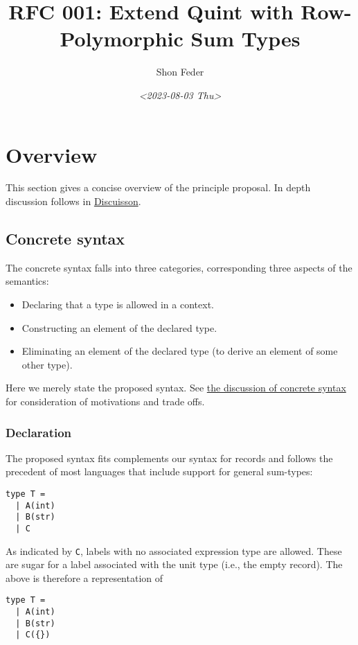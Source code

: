 \documentclass[11pt]{article}
\author{Shon Feder}
\date{\textit{<2023-08-03 Thu>}}
\title{RFC 001: Extend Quint with Row-Polymorphic Sum Types}
\begin{document}
\maketitle
\tableofcontents


\section{Overview}
\label{sec:org1baf532}
This section gives a concise overview of the principle proposal. In
depth discussion follows in \hyperref[sec:org3b0e6b8]{Discuisson}.

\subsection{Concrete syntax}
\label{sec:org047ba8c}
The concrete syntax falls into three categories, corresponding three aspects of
the semantics:

\begin{itemize}
\item Declaring that a type is allowed in a context.
\item Constructing an element of the declared type.
\item Eliminating an element of the declared type (to derive an element of some
other type).
\end{itemize}

Here we merely state the proposed syntax. See \hyperref[sec:orgf128100]{the discussion of concrete syntax}
for consideration of motivations and trade offs.

\subsubsection{Declaration}
\label{sec:orgb260f62}
The proposed syntax fits complements our syntax for records and follows the
precedent of most languages that include support for general sum-types:

\begin{verbatim}
type T =
  | A(int)
  | B(str)
  | C
\end{verbatim}

As indicated by \texttt{C}, labels with no associated expression type are allowed.
These are sugar for a label associated with the unit type (i.e., the empty
record). The above is therefore a representation of

\begin{verbatim}
type T =
  | A(int)
  | B(str)
  | C({})
\end{verbatim}
\end{document}
